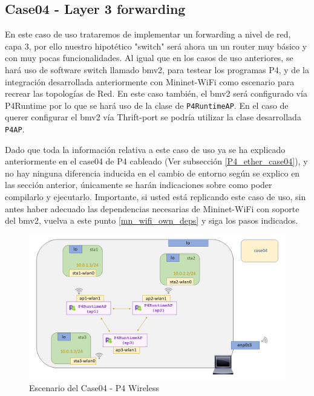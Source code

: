 \subsection{Case04 - Layer 3 forwarding}
\label{p4_wifi_case04}


 En este caso de uso trataremos de implementar un forwarding a nivel de red, capa 3, por ello nuestro hipotético "switch" será ahora un un router muy básico y con muy pocas funcionalidades. Al igual que en los casos de uso anteriores, se hará uso de software switch llamado \gls{bmv2}, para testear los programas P4, y de la integración desarrollada anteriormente con Mininet-WiFi como escenario para recrear las topologías de Red. En este caso también, el \gls{bmv2} será configurado vía P4Runtime  por lo que se hará uso de la clase de \texttt{P4RuntimeAP}. En el caso de querer configurar el \gls{bmv2} vía Thrift-port se podría utilizar la clase desarrollada \texttt{P4AP}.\\
\par

Dado que toda la información relativa a este caso de uso ya se ha explicado anteriormente en el case04 de P4 cableado (Ver subsección \ref{P4_ether_case04}), y no hay ninguna diferencia inducida en el cambio de entorno según se explico en las sección anterior,  únicamente se harán indicaciones sobre como poder compilarlo y ejecutarlo. Importante, si usted está replicando este caso de uso, sin antes haber adecuado las dependencias necesarias de Mininet-WiFi con soporte del \gls{bmv2}, vuelva a este punto \ref{mn_wifi_own_deps} y siga los pasos indicados.\\
\par

\begin{figure}[ht]
    \centering
    \includegraphics[width=16cm]{archivos/img/dev/p4-wifi/case04/scenario.png}
    \caption{Escenario del Case04 - P4 Wireless}
    \label{fig:case04_p4_wifi_scenario}
\end{figure}



